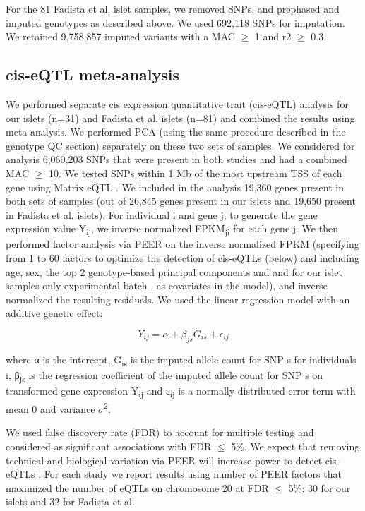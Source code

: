For the 81 Fadista et al. islet samples, we removed SNPs, and prephased and imputed genotypes as described above. We used 692,118 SNPs for imputation. We retained 9,758,857 imputed variants with a MAC $\geq$ 1 and r2 $\geq$ 0.3.

\subsection{cis-eQTL meta-analysis}
We performed separate cis expression quantitative trait (cis-eQTL) analysis for our islets (n=31) and Fadista et al. islets (n=81) and combined the results using meta-analysis. We performed PCA (using the same procedure described in the genotype QC section) separately on these two sets of samples.  We considered for analysis 6,060,203 SNPs that were present in both studies and had a combined MAC $\geq$ 10. We tested SNPs within 1 Mb of the most upstream TSS of each gene using Matrix eQTL \cite{shabalinMatrixEQTLUltra2012}. We included in the analysis 19,360 genes present in both sets of samples (out of 26,845 genes present in our islets and 19,650 present in Fadista et al. islets). For individual i and gene j, to generate the gene expression value Y\textsubscript{ij}, we inverse normalized FPKM\textsubscript{ji} for each gene j. We then performed factor analysis via PEER \cite{stegleBayesianFrameworkAccount2010, stegleUsingProbabilisticEstimation2012} on the inverse normalized FPKM (specifying from 1 to 60 factors to optimize the detection of cis-eQTLs (below) and including age, sex, the top 2 genotype-based principal components and and for our islet samples only experimental batch , as covariates in the model), and inverse normalized the resulting residuals. We used the linear regression model with an additive genetic effect: 

\[Y_{ij} = \alpha + \beta_{js}G_{is} + \epsilon_{ij} \]

where α is the intercept, G\textsubscript{is} is the imputed allele count for SNP s for individuals i, β\textsubscript{js} is the regression coefficient of the imputed allele count for SNP s on transformed gene expression Y\textsubscript{ij} and ε\textsubscript{ij} is a normally distributed error term with mean 0 and variance $\sigma$\textsuperscript{2}.
 
We used false discovery rate (FDR) \cite{storeyStatisticalSignificanceGenomewide2003} to account for multiple testing and considered as significant associations with FDR $\leq$ 5\%. We expect that removing technical and biological variation via PEER will increase power to detect cis-eQTLs \cite{scottGeneticRegulatorySignature2016}. For each study we report results using number of PEER factors that maximized the number of eQTLs on chromosome 20 at FDR $\leq$ 5\%: 30 for our islets and 32 for Fadista et al.

